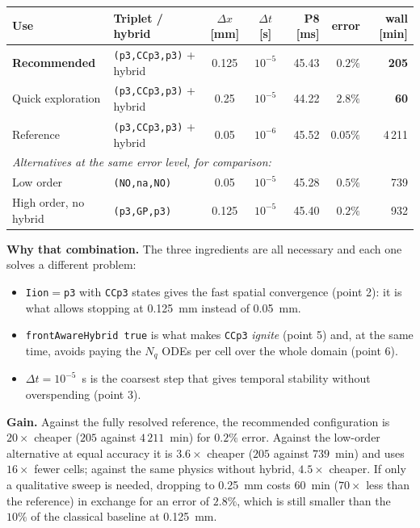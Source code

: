 \documentclass[11pt,a4paper]{article}
\newcommand{\code}[1]{\texttt{\small #1}}
\begin{document}
\begin{center}\footnotesize
\begin{tabular}{llccrrr}
\toprule
Use & Triplet / hybrid & $\Delta x$ [mm] & $\Delta t$ [s] & P8 [ms] & error & wall [min]\\
\midrule
\textbf{Recommended} & \code{(p3,CCp3,p3)} + hybrid & 0.125 & $10^{-5}$ & 45.43 & $0.2\%$ & \textbf{205}\\
Quick exploration    & \code{(p3,CCp3,p3)} + hybrid & 0.25  & $10^{-5}$ & 44.22 & $2.8\%$ & \textbf{60}\\
Reference            & \code{(p3,CCp3,p3)} + hybrid & 0.05  & $10^{-6}$ & 45.52 & $0.05\%$ & 4\,211\\
\midrule
\multicolumn{7}{l}{\emph{Alternatives at the same error level, for comparison:}}\\
Low order            & \code{(NO,na,NO)}            & 0.05  & $10^{-5}$ & 45.28 & $0.5\%$ & 739\\
High order, no hybrid & \code{(p3,GP,p3)}           & 0.125 & $10^{-5}$ & 45.40 & $0.2\%$ & 932\\
\bottomrule
\end{tabular}
\end{center}

\noindent\textbf{Why that combination.} The three ingredients are all necessary and each
one solves a different problem:
\begin{itemize}[topsep=2pt,itemsep=2pt,leftmargin=1.4em]
  \item \code{Iion}$=$\code{p3} with \code{CCp3} states gives the fast spatial
        convergence (point 2): it is what allows stopping at \SI{0.125}{mm} instead of
        \SI{0.05}{mm}.
  \item \code{frontAwareHybrid true} is what makes \code{CCp3} \emph{ignite}
        (point 5) and, at the same time, avoids paying the $N_q$ ODEs per cell over the whole
        domain (point 6).
  \item $\Delta t=10^{-5}$~s is the coarsest step that gives temporal stability without
        overspending (point 3).
\end{itemize}

\noindent\textbf{Gain.} Against the fully resolved reference, the recommended
configuration is $20\times$ cheaper ($205$ against $4\,211$~min) for $0.2\%$ error.
Against the low-order alternative at equal accuracy it is $3.6\times$ cheaper ($205$
against $739$~min) and uses $16\times$ fewer cells; against the same physics without hybrid,
$4.5\times$ cheaper. If only a qualitative sweep is needed, dropping to
\SI{0.25}{mm} costs $60$~min ($70\times$ less than the reference) in exchange for an error
of $2.8\%$, which is still smaller than the $10\%$ of the classical baseline at \SI{0.125}{mm}.
\end{document}
